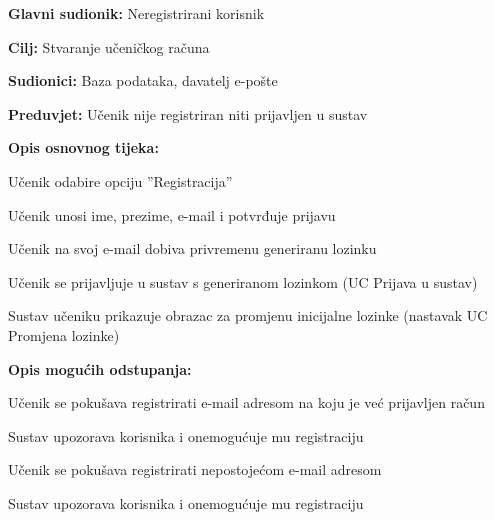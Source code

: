 \noindent {}
\begin{packed_item}

	\item \textbf{Glavni sudionik:} Neregistrirani korisnik
	\item  \textbf{Cilj:} Stvaranje učeničkog računa
	\item  \textbf{Sudionici:} Baza podataka, davatelj e-pošte
	\item  \textbf{Preduvjet:} Učenik nije registriran niti prijavljen u sustav
	\item  \textbf{Opis osnovnog tijeka:}
	
	\item[] \begin{packed_enum}

		\item Učenik odabire opciju ”Registracija”
		\item Učenik unosi ime, prezime, e-mail i potvrđuje prijavu
		\item Učenik na svoj e-mail dobiva privremenu generiranu lozinku
		\item Učenik se prijavljuje u sustav s generiranom lozinkom (UC Prijava u sustav)							
		\item Sustav učeniku prikazuje obrazac za promjenu inicijalne lozinke (nastavak UC Promjena lozinke)
	\end{packed_enum}
	
	\item  \textbf{Opis mogućih odstupanja:}
	
	\item[] \begin{packed_item}

		\item[2.a]Učenik se pokušava registrirati e-mail adresom na koju je već prijavljen račun
		\item[] \begin{packed_enum}
			
			\item Sustav upozorava korisnika i onemogućuje mu registraciju							
		\end{packed_enum}

\item[2.b] Učenik se pokušava registrirati nepostojećom e-mail adresom
\item[] \begin{packed_enum}

\item Sustav upozorava korisnika i onemogućuje mu registraciju 								
\end{packed_enum}

\end{packed_item}
\end{packed_item}

